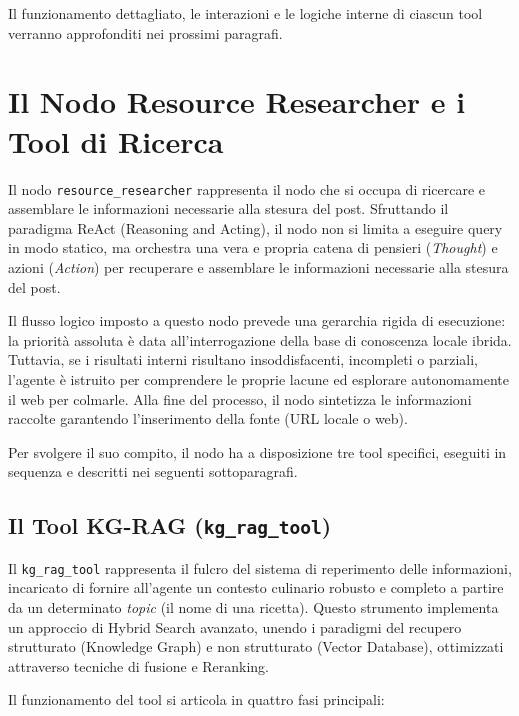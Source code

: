 \documentclass[11pt, a4paper]{article}
\begin{document}
Il funzionamento dettagliato, le interazioni e le logiche interne di ciascun tool verranno approfonditi nei prossimi paragrafi.
\section{Il Nodo Resource Researcher e i Tool di Ricerca}

Il nodo \texttt{resource\_researcher} rappresenta il nodo che si occupa di ricercare e assemblare le informazioni necessarie alla stesura del post. Sfruttando il paradigma ReAct (Reasoning and Acting), il nodo non si limita a eseguire query in modo statico, ma orchestra una vera e propria catena di pensieri (\textit{Thought}) e azioni (\textit{Action}) per recuperare e assemblare le informazioni necessarie alla stesura del post. 

Il flusso logico imposto a questo nodo prevede una gerarchia rigida di esecuzione: la priorità assoluta è data all'interrogazione della base di conoscenza locale ibrida. Tuttavia, se i risultati interni risultano insoddisfacenti, incompleti o parziali, l'agente è istruito per comprendere le proprie lacune ed esplorare autonomamente il web per colmarle. Alla fine del processo, il nodo sintetizza le informazioni raccolte garantendo l'inserimento della fonte (URL locale o web).

Per svolgere il suo compito, il nodo ha a disposizione tre tool specifici, eseguiti in sequenza e descritti nei seguenti sottoparagrafi.

\subsection{Il Tool KG-RAG (\texttt{kg\_rag\_tool})}

Il \texttt{kg\_rag\_tool} rappresenta il fulcro del sistema di reperimento delle informazioni, incaricato di fornire all'agente un contesto culinario robusto e completo a partire da un determinato \textit{topic} (il nome di una ricetta). Questo strumento implementa un approccio di Hybrid Search avanzato, unendo i paradigmi del recupero strutturato (Knowledge Graph) e non strutturato (Vector Database), ottimizzati attraverso tecniche di fusione e Reranking.

Il funzionamento del tool si articola in quattro fasi principali:
\end{document}

